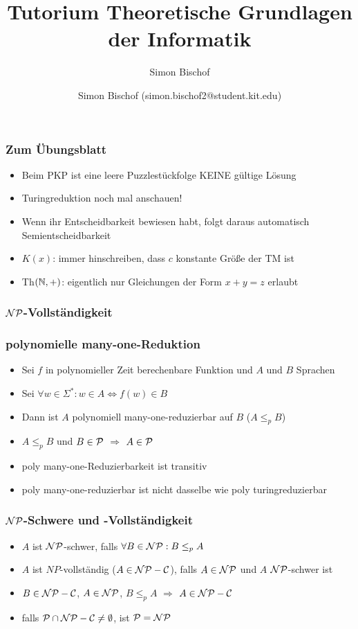\documentclass{beamer}
\author{Simon Bischof (simon.bischof2@student.kit.edu)}
\title{Tutorium Theoretische Grundlagen der Informatik}
\subtitle{Simon Bischof}
\institute{Institut f\"{u}r Kryptographie und Sicherheit}
\newcommand{\F}{\Sigma^*}
\newcommand{\N}{\ensuremath \mathbb{N}}
\renewcommand{\P}{\ensuremath \mathcal{P}}
\newcommand{\NP}{\ensuremath \mathcal{NP}}
\newcommand{\NPC}{\ensuremath \mathcal{NP-C}}
\begin{document}
\begin{frame}
\maketitle
\end{frame}

\begin{frame}
\frametitle{Zum Übungsblatt}
\begin{itemize}
\item Beim PKP ist eine leere Puzzlestückfolge KEINE gültige Lösung
\item Turingreduktion noch mal anschauen!
\item Wenn ihr Entscheidbarkeit bewiesen habt, folgt daraus automatisch Semientscheidbarkeit
\item $K(x)$: immer hinschreiben, dass $c$ konstante Größe der TM ist
\item Th$(\N,+)$: eigentlich nur Gleichungen der Form $x+y=z$ erlaubt
\end{itemize}
\end{frame}

\begin{frame}
\frametitle{$\NP$-Vollständigkeit}
\end{frame}

\begin{frame}
\frametitle{polynomielle many-one-Reduktion}
\begin{itemize}
\item Sei $f$ in polynomieller Zeit berechenbare Funktion und $A$ und $B$ Sprachen
\item Sei $\forall w\in\F: w\in A\Leftrightarrow f(w)\in B$
\item Dann ist $A$ polynomiell many-one-reduzierbar auf $B$ ($A\leq_p B$)\pause
\item $A\leq_p B$ und $B\in\P$ $\Rightarrow$ $A\in\P$
\item poly many-one-Reduzierbarkeit ist transitiv\pause
\item poly many-one-reduzierbar ist nicht dasselbe wie poly turingreduzierbar
\end{itemize}
\end{frame}

\begin{frame}
\frametitle{$\NP$-Schwere und -Vollständigkeit}
\begin{itemize}
\item $A$ ist $\NP$-schwer, falls $\forall B\in\NP: B\leq_p A$\pause
\item $A$ ist $NP$-vollständig ($A\in\NPC$), falls $A\in\NP$ und $A$ $\NP$-schwer ist\pause
\item $B\in\NPC$, $A\in\NP$, $B\leq_p A$ $\Rightarrow$ $A\in\NPC$\pause
\item falls $\P\cap\NPC\neq\emptyset$, ist $\P=\NP$
\end{itemize}
\end{frame}
\end{document}
